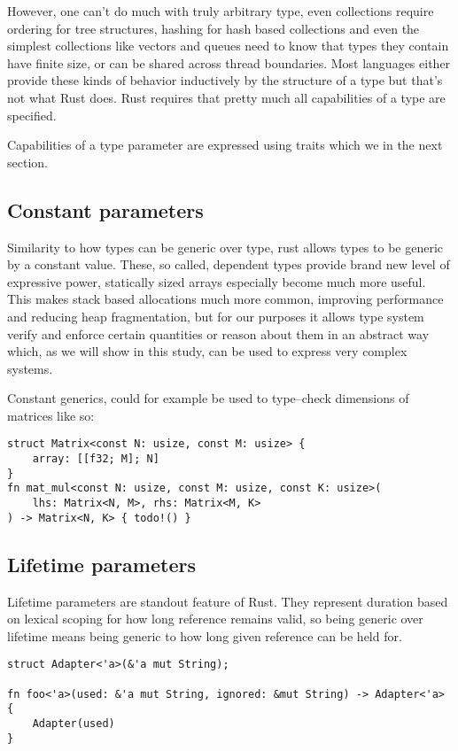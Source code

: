 However, one can't do much with truly arbitrary type, even collections require ordering for tree structures, hashing for hash based collections and even the simplest collections
like vectors and queues need to know that types they contain have finite size, or can be shared across thread boundaries. Most languages either provide these kinds of behavior
inductively by the structure of a type but that's not what Rust does. Rust requires that pretty much all capabilities of a type are specified.

Capabilities of a type parameter are expressed using traits which we in the next section.

\subsection{Constant parameters}

Similarity to how types can be generic over type, rust allows types to be generic by a constant value. These, so called, dependent types
provide brand new level of expressive power, statically sized arrays especially become much more useful. This makes stack based allocations much more common,
improving performance and reducing heap fragmentation, but for our purposes it allows type system verify and enforce certain quantities or reason about them in an abstract 
way which, as we will show in this study, can be used to express very complex systems.

Constant generics, could for example be used to type--check dimensions of matrices like so:

\begin{lstlisting}
struct Matrix<const N: usize, const M: usize> {
    array: [[f32; M]; N]
}
fn mat_mul<const N: usize, const M: usize, const K: usize>(
    lhs: Matrix<N, M>, rhs: Matrix<M, K>
) -> Matrix<N, K> { todo!() }
\end{lstlisting}

\subsection{Lifetime parameters}

Lifetime parameters are standout feature of Rust. They represent duration based on lexical scoping for how long reference remains valid, so being generic over lifetime means being generic
to how long given reference can be held for.

\begin{lstlisting}[basicstyle=\small]    
struct Adapter<'a>(&'a mut String);

fn foo<'a>(used: &'a mut String, ignored: &mut String) -> Adapter<'a> {
    Adapter(used)
}
\end{lstlisting}

